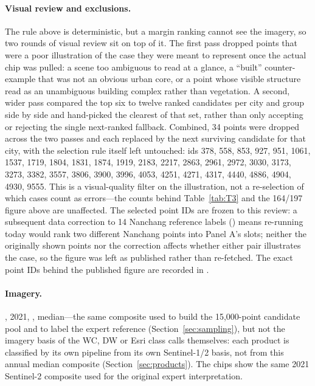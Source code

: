 \documentclass[remotesensing,article,submit,moreauthors]{Definitions/mdpi}
\begin{document}
\paragraph{Visual review and exclusions.} The rule above is deterministic,
but a margin ranking cannot see the imagery, so two rounds of visual review
sit on top of it. The first pass dropped points that were a poor
illustration of the case they were meant to represent once the actual chip
was pulled: a scene too ambiguous to read at a glance, a ``built''
counter-example that was not an obvious urban core, or a point whose visible
structure read as an unambiguous building complex rather than vegetation. A
second, wider pass compared the top six to twelve ranked candidates per city
and group side by side and hand-picked the clearest of that set, rather than
only accepting or rejecting the single next-ranked fallback. Combined, 34
points were dropped across the two passes and each replaced by the next
surviving candidate for that city, with the selection rule itself left
untouched: ids 378, 558, 853, 927, 951, 1061, 1537, 1719, 1804, 1831, 1874,
1919, 2183, 2217, 2863, 2961, 2972, 3030, 3173, 3273, 3382, 3557, 3806, 3900,
3996, 4053, 4251, 4271, 4317, 4440, 4886, 4904, 4930, 9555. This is a
visual-quality filter on the illustration, not a re-selection of which cases
count as errors---the counts behind Table~\ref{tab:T3} and the 164/197
figure above are unaffected. The selected point IDs are frozen to this
review: a subsequent data correction to 14 Nanchang reference labels
() means re-running
 today would rank two different Nanchang
points into Panel A's slots; neither the originally shown points nor the
correction affects whether either pair illustrates the case, so the figure
was left as published rather than re-fetched. The exact point IDs behind
the published figure are recorded in
.

\paragraph{Imagery.} \href{https://developers.google.com/earth-engine/datasets/catalog/COPERNICUS_S2_SR_HARMONIZED}{}, 2021,
, median---the same composite used to
build the 15,000-point candidate pool and to label the expert reference
(Section~\ref{sec:sampling}), but not the imagery basis of the WC, DW or Esri
class calls themselves: each product is classified by its own pipeline from
its own Sentinel-1/2 basis, not from this annual median composite
(Section~\ref{sec:products}). The chips show the same 2021 Sentinel-2
composite used for the original expert interpretation.
\end{document}

